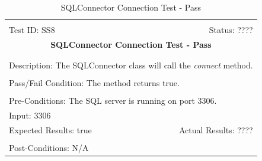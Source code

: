\documentclass[11pt]{article}
\begin{document}
\begin{center}
\begin{table}[H]
\begin{tabular}{|l r|}\hline&\\[-2mm]
	Test ID: SS8	&Status: ????\\[-3mm]
	\multicolumn{2}{|c|}{\textbf{\large{SQLConnector Connection Test - Pass}}}\\&\\\hline&\\[-3mm]
	\multicolumn{2}{|p{\textwidth}|}{Description: The SQLConnector class will call the \textit{connect} method.}\\[1mm]\hline&\\[-3mm]
	\multicolumn{2}{|p{\textwidth}|}{Pass/Fail Condition: The method returns true.}\\[1mm]\hline&\\[-3mm]
	\multicolumn{2}{|p{\textwidth}|}{Pre-Conditions: The SQL server is running on port 3306.}\\[4mm]
	\multicolumn{2}{|p{\textwidth}|}{Input: 3306}\\[2mm]\hline
	\multicolumn{1}{|p{0.49\textwidth}}{Expected Results: true}	&\multicolumn{1}{|p{0.45\textwidth}|}{Actual Results: ????}\\\hline&\\[-3mm]
	\multicolumn{2}{|p{\textwidth}|}{Post-Conditions: N/A}\\\hline
\end{tabular}
\caption{SQLConnector Connection Test - Pass}
\end{table}
\end{center}
\end{document}
